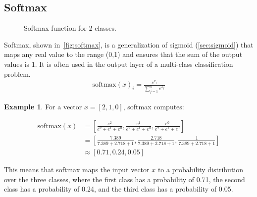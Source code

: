 \documentclass[oneside,11pt,dvipsnames]{book}
\numberwithin{equation}{section}
\theoremstyle{definition}
\newtheorem{example}{Example}[section]
\theoremstyle{remark}
\newcommand{\softmax}[1]{\mathrm{softmax}\left(#1\right)}
\begin{document}
\subsection{Softmax}\label{sec:softmax}


\begin{figure}[htp]
    \centering
    \caption{Softmax function for 2 classes.}\label{fig:softmax}
\end{figure}


Softmax, shown in~\autoref{fig:softmax}, is a generalization of sigmoid (\autoref{sec:sigmoid}) that maps any real value to the range (0,1) and ensures that the sum of the output values is 1. It is often used in the output layer of a multi-class classification problem.
\begin{align}
\softmax{x}_i = \frac{e^{x_i}}{\sum_{j=1}^{n}e^{x_j}}
\end{align}

\begin{example}
For a vector $x = [2, 1, 0]$, softmax computes: 

{\small
\begin{align*}
\softmax{x} &= \left[\frac{e^2}{e^2+e^1+e^0}, \frac{e^1}{e^2+e^1+e^0}, \frac{e^0}{e^2+e^1+e^0}\right] \\
&= \left[\frac{7.389}{7.389+2.718+1}, \frac{2.718}{7.389+2.718+1}, \frac{1}{7.389+2.718+1}\right] \\
&\approx [0.71, 0.24, 0.05]
\end{align*}
}

This means that softmax maps the input vector $x$ to a probability distribution over the three classes, where the first class has a probability of 0.71, the second class has a probability of 0.24, and the third class has a probability of 0.05.
\end{example}
\end{document}
